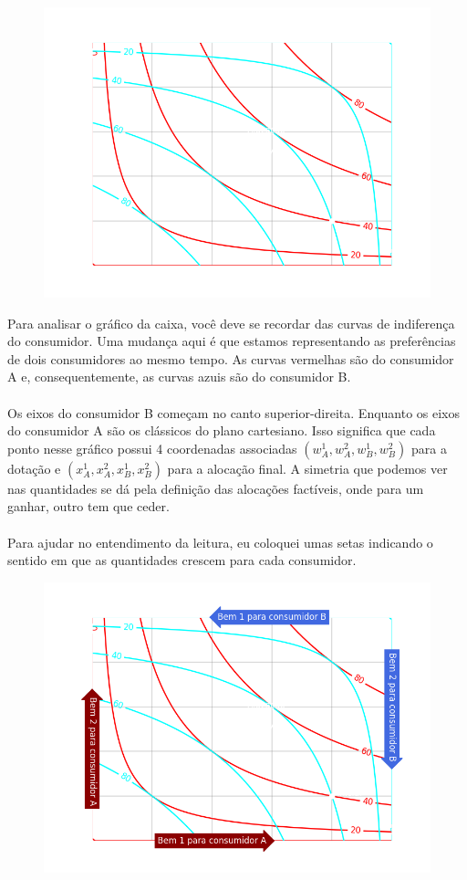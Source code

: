 \documentclass[a4paper,11pt,oneside]{book}
\theoremstyle{definition}
\theoremstyle{break}
\begin{document}
\begin{figure}[H]
\centering
\includegraphics[scale=0.8]{cap32_1-caixa_edgeworth_1.png}
\end{figure}

Para analisar o gráfico da caixa, você deve se recordar das curvas de indiferença do consumidor. Uma mudança aqui é que estamos representando as preferências de dois consumidores ao mesmo tempo. As curvas vermelhas são do consumidor A e, consequentemente, as curvas azuis são do consumidor B.
\\~\\
Os eixos do consumidor B começam no canto superior-direita. Enquanto os eixos do consumidor A são os clássicos do plano cartesiano. Isso significa que cada ponto nesse gráfico possui 4 coordenadas associadas $(w_A^1, w_A^2, w_B^1, w_B^2)$ para a dotação e $(x_A^1, x_A^2, x_B^1, x_B^2)$ para a alocação final. A simetria que podemos ver nas quantidades se dá pela definição das alocações factíveis, onde para um ganhar, outro tem que ceder. 
\\~\\
Para ajudar no entendimento da leitura, eu coloquei umas setas indicando o sentido em que as quantidades crescem para cada consumidor.

\begin{figure}[H]
\centering
\includegraphics[scale=0.8]{cap32_1-caixa_edgeworth_2.png}
\end{figure}
\end{document}
